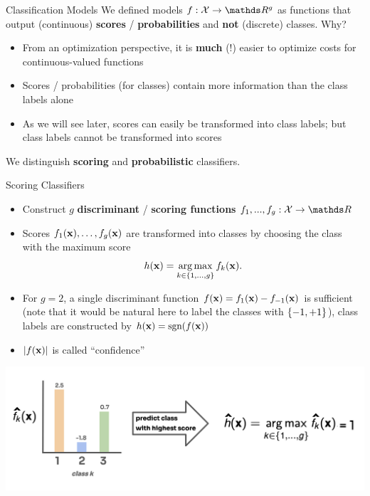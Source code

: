 \documentclass[11pt,compress,t,notes=noshow, xcolor=table]{beamer}
\begin{document}
\begin{vbframe}{Classification Models} 
We defined models $f: \Xspace \to \R^g$ as functions that output (continuous) \textbf{scores} / \textbf{probabilities} and \textbf{not} (discrete) classes. Why? 

\begin{itemize}
  \item From an optimization perspective, it is \textbf{much} (!) easier to optimize costs for continuous-valued functions 
  \item Scores / probabilities (for classes) contain more information than the class labels alone
  \item As we will see later, scores can easily be transformed into class labels; but class labels cannot be transformed into scores
\end{itemize}

We distinguish \textbf{scoring} and \textbf{probabilistic} classifiers.
\end{vbframe}


\begin{vbframe}{Scoring Classifiers}
\begin{itemize}
\item Construct $g$ \textbf{discriminant} / \textbf{scoring functions} $f_1, ..., f_g: \Xspace \to \R$
\item Scores $f_1(\xv), \ldots, \fkx[g]$ are transformed into classes by choosing the class with the maximum score 
$$
h(\xv) = \argmax_{k \in \gset} \fkx[k]. 
$$ 

\item For $g = 2$, a single discriminant function $\fx = f_{1}(\xv) - f_{-1}(\xv)$ is sufficient (note that it would be natural here to label the classes with $\setmp$), class labels are constructed by $\hx = \text{sgn}(\fx)$
\item $|\fx|$ is called \enquote{confidence}
\end{itemize}

\vspace{-0.3cm}

\begin{center}
  \includegraphics[clip=true, trim={0 60 0 30}]{figure_man/scores.png} 
\end{center}
 
\end{vbframe}
\end{document}
